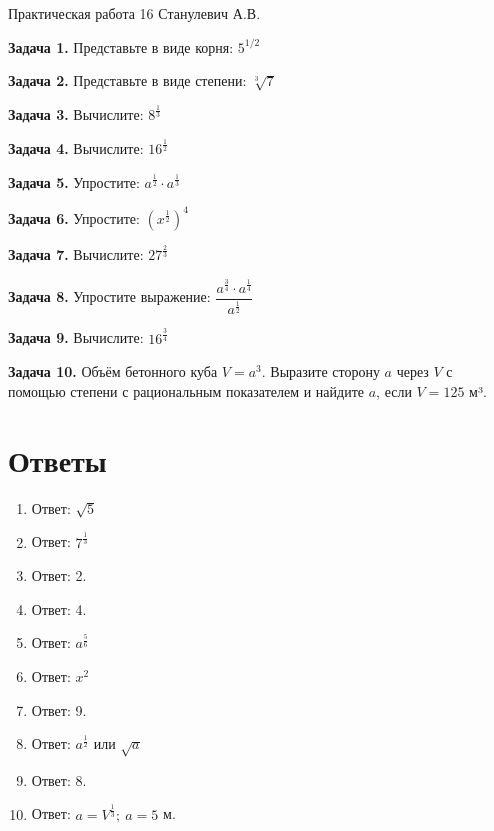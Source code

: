 \documentclass{umk-matematika}
\begin{document}
\maketitlepage
    {Практическая работа 16}
    {}
    {Станулевич А.В.}

\textbf{Задача 1.} Представьте в виде корня: $5^{1/2}$\par\vspace{10pt}
\textbf{Задача 2.} Представьте в виде степени: $\sqrt[3]{7}$\par\vspace{10pt}
\textbf{Задача 3.} Вычислите: $8^{\frac{1}{3}}$\par\vspace{10pt}
\textbf{Задача 4.} Вычислите: $16^{\frac{1}{2}}$\par\vspace{10pt}
\textbf{Задача 5.} Упростите: $a^{\frac{1}{2}} \cdot a^{\frac{1}{3}}$\par\vspace{10pt}
\textbf{Задача 6.} Упростите: $\left(x^{\frac{1}{2}}\right)^4$\par\vspace{10pt}
\textbf{Задача 7.} Вычислите: $27^{\frac{2}{3}}$\par\vspace{10pt}
\textbf{Задача 8.} Упростите выражение: $\dfrac{a^{\frac{3}{4}} \cdot a^{\frac{1}{4}}}{a^{\frac{1}{2}}}$\par\vspace{10pt}
\textbf{Задача 9.} Вычислите: $16^{\frac{3}{4}}$\par\vspace{10pt}
\textbf{Задача 10.} Объём бетонного куба $V = a^3$. Выразите сторону $a$ через $V$ с помощью степени с рациональным показателем и найдите $a$, если $V = 125$ м³.\par\vspace{10pt}
\newpage
\section*{Ответы}

\begin{enumerate}
  \item Ответ: $\sqrt{5}$
  \item Ответ: $7^{\frac{1}{3}}$
  \item Ответ: 2.
  \item Ответ: 4.
  \item Ответ: $a^{\frac{5}{6}}$
  \item Ответ: $x^2$
  \item Ответ: 9.
  \item Ответ: $a^{\frac{1}{2}}$ или $\sqrt{a}$
  \item Ответ: 8.
  \item Ответ: $a = V^{\frac{1}{3}};\ a = 5$ м.
\end{enumerate}
\end{document}
